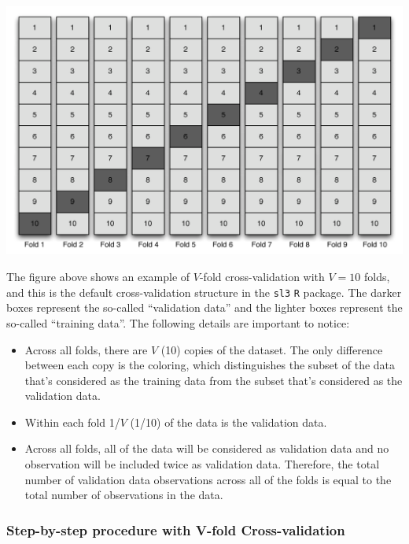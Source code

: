 \documentclass[
  12pt, krantz2,
]{krantz}
\newcommand{\passthrough}[1]{#1}
\providecommand{\tightlist}{%
  \setlength{\itemsep}{0pt}\setlength{\parskip}{0pt}}
\newcommand{\1}{\mathbbm{1}}
\theoremstyle{definition}
\theoremstyle{definition}
\theoremstyle{definition}
\theoremstyle{definition}
\theoremstyle{remark}
\begin{document}
\begin{center}\includegraphics[width=0.8\linewidth]{img/png/vs} \end{center}

The figure above shows an example of \(V\)-fold cross-validation with \(V=10\)
folds, and this is the default cross-validation structure in the \passthrough{\lstinline!sl3!} \passthrough{\lstinline!R!}
package. The darker boxes represent the so-called ``validation data'' and the
lighter boxes represent the so-called ``training data''. The following details
are important to notice:

\begin{itemize}
\tightlist
\item
  Across all folds, there are \(V\) (10) copies of the dataset. The only
  difference between each copy is the coloring, which distinguishes the subset
  of the data that's considered as the training data from the subset that's
  considered as the validation data.
\item
  Within each fold 1/\(V\) (1/10) of the data is the validation data.
\item
  Across all folds, all of the data will be considered as validation data and
  no observation will be included twice as validation data. Therefore, the
  total number of validation data observations across all of the folds is
  equal to the total number of observations in the data.
\end{itemize}

\hypertarget{step-by-step-procedure-with-v-fold-cross-validation}{%
\subsubsection{Step-by-step procedure with V-fold Cross-validation}\label{step-by-step-procedure-with-v-fold-cross-validation}}
\end{document}
